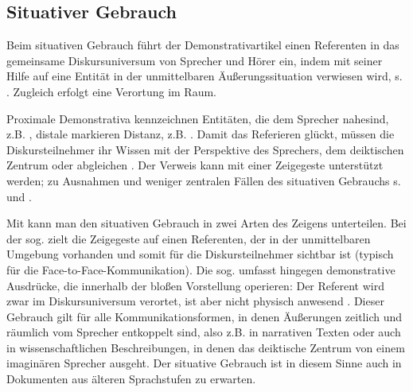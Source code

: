 \subsection{Situativer Gebrauch}\label{sec:situativ}

Beim situativen Gebrauch \parencite[auch deiktischer Gebrauch, z.B. bei][]{Bisle-Muller1991,Consten2004,Studler2011} führt der Demonstrativartikel einen Referenten in das gemeinsame Diskursuniversum von Sprecher und Hörer ein, indem mit seiner Hilfe auf eine Entität in der unmittelbaren Äußerungssituation verwiesen wird, s. . Zugleich erfolgt eine Verortung im Raum.

\begin{exe}
	\ex \label{ex:deikt} 
\end{exe}

Proximale Demonstrativa kennzeichnen Entitäten, die dem Sprecher nahe\linebreak sind, z.B. , distale markieren Distanz, z.B. .
Damit das Referieren glückt, müssen die Diskursteilnehmer ihr Wissen mit der Perspektive des Sprechers, dem deiktischen Zentrum oder   \parencite{Buhler1934} abgleichen  \parencite[s. auch][327ff.]{Hoffmann2009}. Der Verweis kann mit einer Zeigegeste unterstützt werden; zu Ausnahmen und weniger zentralen Fällen des situativen Gebrauchs s. \textcite[94-95]{Diessel1999} und \textcite[219--224]{Himmelmann1996}. 

Mit \textcite[]{Buhler1934} kann man den situativen Gebrauch in zwei Arten des Zeigens unterteilen. Bei der sog.  zielt die Zeigegeste auf einen Referenten, der in der unmittelbaren Umgebung vorhanden und somit für die Diskursteilnehmer sichtbar ist (typisch für die Face-to-Face-Kommunikation). Die sog.  umfasst hingegen demonstrative Ausdrücke, die innerhalb der bloßen Vorstellung operieren: Der Referent wird zwar im Diskursuniversum verortet, ist aber nicht physisch anwesend \parencite[s. auch][222]{Himmelmann1996}. Dieser Gebrauch gilt für alle Kommunikationsformen, in denen Äußerungen zeitlich und räumlich vom Sprecher entkoppelt sind, also z.B. in narrativen Texten \parencite[95]{Diessel1999} oder auch in wissenschaftlichen Beschreibungen, in denen das deiktische Zentrum von einem imaginären Sprecher ausgeht. Der situative Gebrauch ist in diesem Sinne auch in Dokumenten aus älteren Sprachstufen zu erwarten. 

